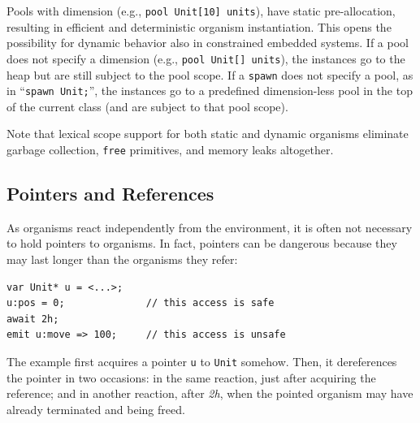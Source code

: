 \documentclass{acm_proc_article-sp}
\newcommand{\code}[1] {{\small{\texttt{#1}}}}
\newcommand{\1}{\;}
\newcommand{\2}{\;\;}
\newcommand{\3}{\;\;\;}
\newcommand{\5}{\;\;\;\;\;}
\begin{document}
Pools with dimension (e.g., \code{pool Unit[10] units}), have static 
pre-allocation, resulting in efficient and deterministic organism 
instantiation.
This opens the possibility for dynamic behavior also in constrained embedded 
systems.
%
If a pool does not specify a dimension (e.g., \code{pool Unit[] units}), the 
instances go to the heap but are still subject to the pool scope.
%
If a \code{spawn} does not specify a pool, as in ``\code{spawn Unit;}'', the 
instances go to a predefined dimension-less pool in the top of the current 
class (and are subject to that pool scope).

Note that lexical scope support for both static and dynamic organisms eliminate 
garbage collection, \code{free} primitives, and memory leaks altogether.

\subsection{Pointers and References}
\label{sec.orgs.refs}

As organisms react independently from the environment, it is often not 
necessary to hold pointers to organisms.
%
In fact, pointers can be dangerous because they may last longer than the 
organisms they refer:

\begin{lstlisting}
var Unit* u = <...>;
u:pos = 0;              // this access is safe
await 2h;
emit u:move => 100;     // this access is unsafe
\end{lstlisting}

The example first acquires a pointer \code{u} to \code{Unit} somehow.
Then, it dereferences the pointer in two occasions:
in the same reaction, just after acquiring the reference;
and in another reaction, after \emph{2h}, when the pointed organism may have 
already terminated and being freed.
\end{document}
